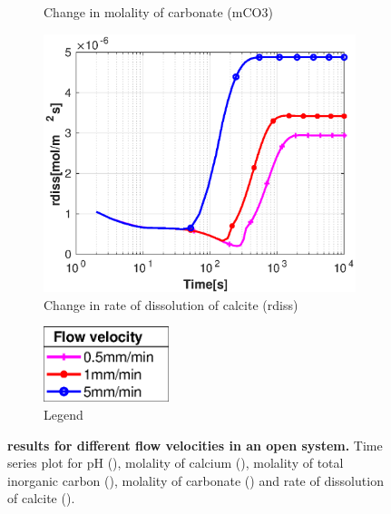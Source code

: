 \begin{figure}[!h]
\begin{subfigure}{.5\linewidth}
        \caption{\small Change in molality of carbonate (mCO3)}
        \label{fig:velmCO3}
    \end{subfigure}%
    \hfill
    \begin{subfigure}{.5\linewidth}
        \centering
        \includegraphics[width=\textwidth]{PICTURES/with_vel_rdiss.eps}
        \caption{\small Change in rate of dissolution of calcite (rdiss)}
        \label{fig:velrdiss}
    \end{subfigure}%
    \begin{subfigure}{.5\linewidth}
        \centering
        \includegraphics[width=0.40\textwidth]{PICTURES/with_vel_legend.eps}
        \caption{\small Legend}
        \label{fig:vellegend}
    \end{subfigure}%
    \hfill
     \caption [\DuMuX results for different flow velocities in an open system.] {\textbf{\DuMuX results 
     for different flow velocities in an open system.} \small Time series plot for pH (), 
     molality of calcium (), molality of total inorganic carbon (), molality of 
     carbonate () and rate of dissolution of calcite ().}
     \label{fig:comparisionDiffFlowVelocity}
\end{figure}

